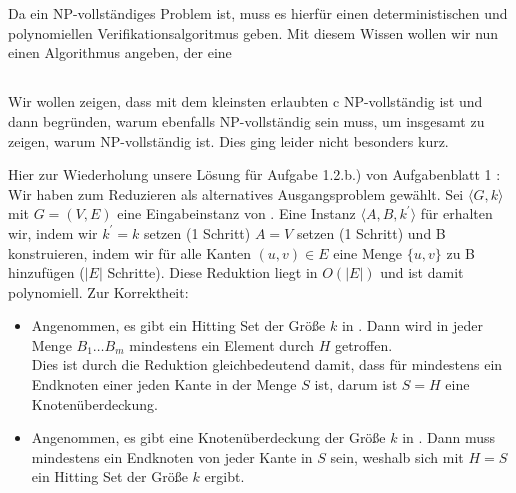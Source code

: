 \documentclass[a4paper]{article}
\begin{document}
	\maketitle
	\section{}
		\subsection{}
		Da \chitset ein NP-vollständiges Problem ist, muss es hierfür einen deterministischen und polynomiellen Verifikationsalgoritmus geben. \n
		Mit diesem Wissen wollen wir nun einen Algorithmus angeben, der eine 
		
		\subsection{}
		
		
		
		\subsection{}
		Wir wollen zeigen, dass \twohitset mit dem kleinsten erlaubten c NP-vollständig ist und dann begründen, warum \cpohitset ebenfalls NP-vollständig sein muss, um insgesamt zu zeigen, warum \chitset NP-vollständig ist. Dies ging leider nicht besonders kurz. \n
		
Hier zur Wiederholung unsere Lösung für Aufgabe 1.2.b.) von Aufgabenblatt 1 : \n
Wir haben zum Reduzieren als alternatives Ausgangsproblem \vertexcover gewählt.\n
			Sei $ \langle G, k \rangle $ mit $ G = (V, E)$ eine Eingabeinstanz von \vertexcover. Eine Instanz $ \langle A,B, k^\prime \rangle $ für \hitset erhalten wir, indem wir $k^\prime = k$ setzen (1 Schritt) $A=V$ setzen (1 Schritt) und B konstruieren, indem wir für alle Kanten $(u,v) \in E$ eine Menge $\{u,v\}$ zu B hinzufügen ($|E|$ Schritte).\n
			Diese Reduktion liegt in $O(|E|)$ und ist damit polynomiell.\n
			Zur Korrektheit:
			\begin{itemize}
				\item Angenommen, es gibt ein Hitting Set der Größe $k$ in \hitset. Dann wird in jeder Menge $B_1 \dots B_m$ mindestens ein Element durch $H$ getroffen. \\
				Dies ist durch die Reduktion gleichbedeutend damit, dass für \vertexcover mindestens ein Endknoten einer jeden Kante in der Menge $S$ ist, darum ist $S = H$ eine Knotenüberdeckung.
				\item Angenommen, es gibt eine Knotenüberdeckung der Größe $k$ in \vertexcover. Dann muss mindestens ein Endknoten von jeder Kante in $S$ sein, weshalb sich mit $H = S$ ein Hitting Set der Größe $k$ ergibt.
			\end{itemize}
\end{document}
